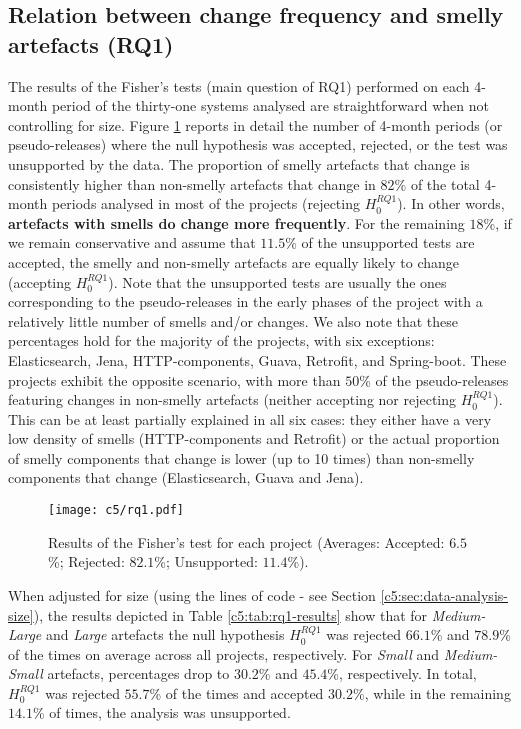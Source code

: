 \subsection{Relation between change frequency and smelly artefacts (RQ1)}
The results of the Fisher's tests (main question of RQ1) performed on each 4-month period of the thirty-one systems analysed are straightforward when not controlling for size.
Figure \ref{c5:fig:rq1-results} reports in detail the number of 4-month periods (or pseudo-releases) where the null hypothesis was accepted, rejected, or the test was unsupported by the data.
The proportion of smelly artefacts that change is consistently higher than non-smelly artefacts that change in $82$\% of the total 4-month periods analysed in most of the projects (rejecting $H^{RQ1}_0$). In other words, \textbf{artefacts with smells do change more frequently}. For the remaining $18$\%, if we remain conservative and assume that $11.5$\% of the unsupported tests are accepted, the smelly and non-smelly artefacts are equally likely to change (accepting $H^{RQ1}_0$).
Note that the unsupported tests are usually the ones corresponding to the pseudo-releases in the early phases of the project with a relatively little number of smells and/or changes.
We also note that these percentages hold for the majority of the projects, with six exceptions: Elasticsearch, Jena, HTTP-components, Guava, Retrofit, and Spring-boot.
These projects exhibit the opposite scenario, with more than $50$\% of the pseudo-releases featuring changes in non-smelly artefacts (neither accepting nor rejecting $H^{RQ1}_0$).
This can be at least partially explained in all six cases: they either have a very low density of smells (HTTP-components and Retrofit) or the actual proportion of smelly components that change is lower (up to 10 times) than non-smelly components that change (Elasticsearch, Guava and Jena).
\begin{figure}[t]
    \centering
    \texttt{[image: c5/rq1.pdf]}
    \caption{Results of the Fisher's test for each project (Averages: Accepted: $6.5$\%; Rejected: $82.1$\%; Unsupported: $11.4$\%).}\label{c5:fig:rq1-results}
\end{figure}

When adjusted for size (using the lines of code - see Section \ref{c5:sec:data-analysis-size}), the results depicted in Table \ref{c5:tab:rq1-results} show that 
for \emph{Medium-Large} and \emph{Large} artefacts the null hypothesis $H^{RQ1}_0$ was rejected $66.1$\% and $78.9$\% of the times on average across all projects, respectively.
For \emph{Small} and \emph{Medium-Small} artefacts, percentages drop to $30.2$\% and $45.4$\%, respectively.
In total,  $H^{RQ1}_0$ was rejected $55.7$\% of the times and accepted $30.2$\%, while in the remaining $14.1$\% of times, the analysis was unsupported.

